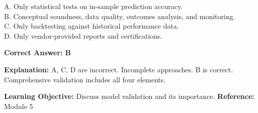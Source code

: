 \documentclass[11pt]{article}
\begin{document}
	A. Only statistical tests on in-sample prediction accuracy.\\
	B. Conceptual soundness, data quality, outcomes analysis, and monitoring.\\
	C. Only backtesting against historical performance data.\\
	D. Only vendor-provided reports and certifications.
	
	\vspace{0.4em}
	\textbf{Correct Answer: B}
	
	\textbf{Explanation:}
	A, C, D are incorrect. Incomplete approaches.
	B is correct. Comprehensive validation includes all four elements.
	
	\textbf{Learning Objective:} Discuss model validation and its importance.
	\textbf{Reference:} Module 5
	


	
\end{document}
